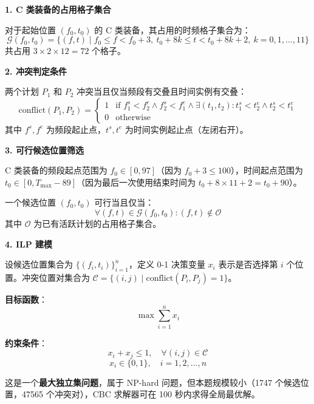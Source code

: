 
\textbf{1. C 类装备的占用格子集合}

对于起始位置 $(f_0, t_0)$ 的 C 类装备，其占用的时频格子集合为：
\begin{equation}
    \mathcal{G}(f_0, t_0) = \{(f, t) \mid f_0 \leq f < f_0 + 3,\ t_0 + 8k \leq t < t_0 + 8k + 2,\ k = 0, 1, \ldots, 11\}
\end{equation}
共占用 $3 \times 2 \times 12 = 72$ 个格子。

\textbf{2. 冲突判定条件}

两个计划 $P_1$ 和 $P_2$ 冲突当且仅当频段有交叠且时间实例有交叠：
\begin{equation}
    \text{conflict}(P_1, P_2) = \begin{cases}
        1 & \text{if } f_1^s < f_2^e \land f_2^s < f_1^e \land \exists (t_1, t_2): t_1^s < t_2^e \land t_2^s < t_1^e \\
        0 & \text{otherwise}
    \end{cases}
\end{equation}
其中 $f^s, f^e$ 为频段起止点，$t^s, t^e$ 为时间实例起止点（左闭右开）。

\textbf{3. 可行候选位置筛选}

C 类装备的频段起点范围为 $f_0 \in [0, 97]$（因为 $f_0 + 3 \leq 100$），时间起点范围为 $t_0 \in [0, T_{\max} - 89]$（因为最后一次使用结束时间为 $t_0 + 8 \times 11 + 2 = t_0 + 90$）。

一个候选位置 $(f_0, t_0)$ 可行当且仅当：
\begin{equation}
    \forall (f, t) \in \mathcal{G}(f_0, t_0): (f, t) \notin \mathcal{O}
\end{equation}
其中 $\mathcal{O}$ 为已有活跃计划的占用格子集合。

\textbf{4. ILP 建模}

设候选位置集合为 $\{(f_i, t_i)\}_{i=1}^n$，定义 0-1 决策变量 $x_i$ 表示是否选择第 $i$ 个位置。冲突位置对集合为 $\mathcal{C} = \{(i, j) \mid \text{conflict}(P_i, P_j) = 1\}$。

\textbf{目标函数}：
\begin{equation}
    \max \sum_{i=1}^{n} x_i
\end{equation}

\textbf{约束条件}：
\begin{equation}
    x_i + x_j \leq 1, \quad \forall (i, j) \in \mathcal{C}
\end{equation}
\begin{equation}
    x_i \in \{0, 1\}, \quad i = 1, 2, \ldots, n
\end{equation}

这是一个\textbf{最大独立集问题}，属于 NP-hard 问题，但本题规模较小（1747 个候选位置，47565 个冲突对），CBC 求解器可在 100 秒内求得全局最优解。
